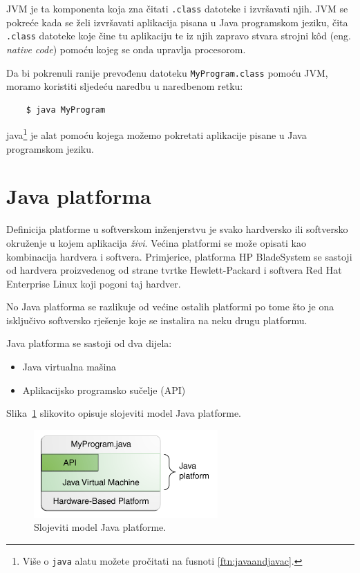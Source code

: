 JVM je ta komponenta koja zna čitati \texttt{.class} datoteke i izvršavati njih. JVM se pokreće kada se želi izvršavati aplikacija pisana u Java programskom jeziku, čita \texttt{.class} datoteke koje čine tu aplikaciju te iz njih zapravo stvara strojni kôd (eng. \emph{native code}) pomoću kojeg se onda upravlja procesorom.

Da bi pokrenuli ranije prevođenu datoteku \texttt{MyProgram.class} pomoću JVM, moramo koristiti sljedeću naredbu u naredbenom retku:

\begin{lstlisting}
    $ java MyProgram
\end{lstlisting}

java\footnote{Više o \texttt{java} alatu možete pročitati na fusnoti \ref{ftn:javaandjavac}.} je alat pomoću kojega možemo pokretati aplikacije pisane u Java programskom jeziku.

\section{Java platforma}
\label{sec:java_platform}
Definicija platforme u softverskom inženjerstvu je svako hardversko ili softversko okruženje u kojem aplikacija \emph{živi}. Većina platformi se može opisati kao kombinacija hardvera i softvera. Primjerice, platforma HP BladeSystem se sastoji od hardvera proizvedenog od strane tvrtke Hewlett-Packard i softvera Red Hat Enterprise Linux koji pogoni taj hardver.

No Java platforma se razlikuje od većine ostalih platformi po tome što je ona isključivo softversko rješenje koje se instalira na neku drugu platformu.

Java platforma se sastoji od dva dijela:

\begin{itemize}
    \item Java virtualna mašina
    \item Aplikacijsko programsko sučelje (API)
\end{itemize}

Slika~\ref{fig:java_platform_layer_model} slikovito opisuje slojeviti model Java platforme.~\cite{javatutorials}

\begin{figure}[h!]
    \caption{Slojeviti model Java platforme.}
    \label{fig:java_platform_layer_model}
    \centering
    \includegraphics[scale=0.6]{images/java_platform_layer_model.png}
\end{figure}

